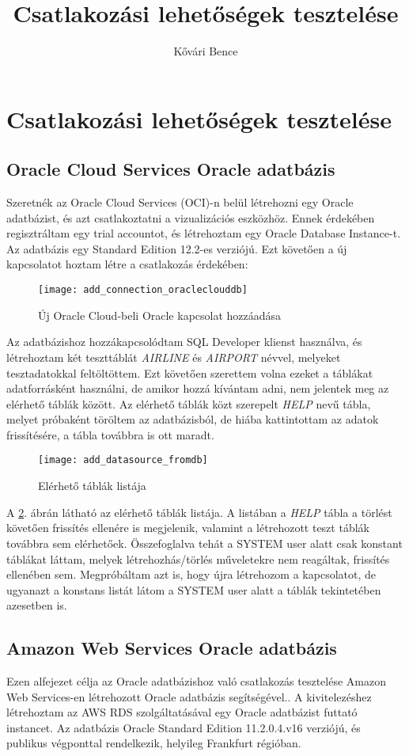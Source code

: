 \documentclass{article}
\author{Kővári Bence}
\title{Csatlakozási lehetőségek tesztelése}
\begin{document}
\section{Csatlakozási lehetőségek tesztelése}
\subsection{Oracle Cloud Services Oracle adatbázis}
Szeretnék az Oracle Cloud Services (OCI)-n belül létrehozni egy Oracle adatbázist, és azt csatlakoztatni a vizualizációs eszközhöz. Ennek érdekében regisztráltam egy trial accountot, és létrehoztam egy Oracle Database Instance-t. Az adatbázis egy Standard Edition 12.2-es verziójú. Ezt követően a új kapcsolatot hoztam létre a csatlakozás érdekében:
\begin{figure}[h!]
	\centering
	\texttt{[image: add\_connection\_oracleclouddb]}
	\caption{Új Oracle Cloud-beli Oracle kapcsolat hozzáadása}
	\label{fig:addconnectionoracleclouddb}
\end{figure}
Az adatbázishoz hozzákapcsolódtam SQL Developer klienst használva, és létrehoztam két teszttáblát \textit{AIRLINE} és \textit{AIRPORT} névvel, melyeket tesztadatokkal feltöltöttem. Ezt követően szerettem volna ezeket a táblákat adatforrásként használni, de amikor hozzá kívántam adni, nem jelentek meg az elérhető táblák között. Az elérhető táblák közt szerepelt \textit{HELP} nevű tábla, melyet próbaként töröltem az adatbázisból, de hiába kattintottam az adatok frissítésére, a tábla továbbra is ott maradt. 
\newpage\begin{figure}[h!]
	\centering
	\texttt{[image: add\_datasource\_fromdb]}
	\caption{Elérhető táblák listája}
	\label{fig:adddatasourcefromdb}
\end{figure}
A \ref{fig:adddatasourcefromdb}. ábrán látható az elérhető táblák listája. A listában a \textit{HELP} tábla a törlést követően frissítés ellenére is megjelenik, valamint a létrehozott teszt táblák továbbra sem elérhetőek. Összefoglalva tehát a SYSTEM user alatt csak konstant táblákat láttam, melyek létrehozhás/törlés műveletekre nem reagáltak, frissítés ellenében sem. Megpróbáltam azt is, hogy újra létrehozom a kapcsolatot, de ugyanazt a konstans listát látom a SYSTEM user alatt a táblák tekintetében azesetben is.
\subsection{Amazon Web Services Oracle adatbázis}
Ezen alfejezet célja az Oracle adatbázishoz való csatlakozás tesztelése Amazon Web Services-en létrehozott Oracle adatbázis segítségével.. A kivitelezéshez létrehoztam az AWS RDS szolgáltatásával egy Oracle adatbázist futtató instancet. Az adatbázis Oracle Standard Edition 11.2.0.4.v16 verziójú, és publikus végponttal rendelkezik, helyileg Frankfurt régióban.
\end{document}
